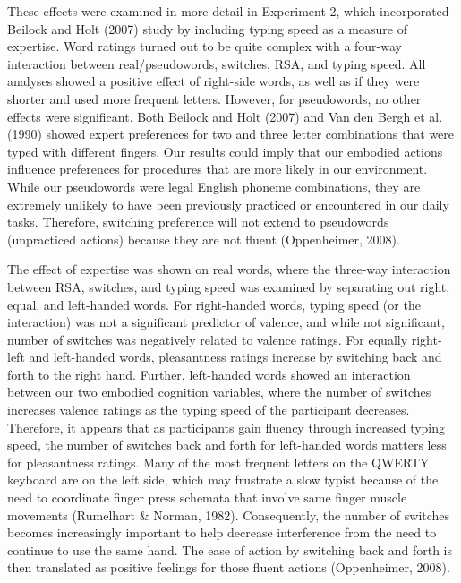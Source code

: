 \documentclass[english,man]{apa6}
\theoremstyle{definition}
\theoremstyle{definition}
\theoremstyle{definition}
\theoremstyle{remark}
\begin{document}
These effects were examined in more detail in Experiment 2, which
incorporated Beilock and Holt (2007) study by including typing speed as
a measure of expertise. Word ratings turned out to be quite complex with
a four-way interaction between real/pseudowords, switches, RSA, and
typing speed. All analyses showed a positive effect of right-side words,
as well as if they were shorter and used more frequent letters. However,
for pseudowords, no other effects were significant. Both Beilock and
Holt (2007) and Van den Bergh et al. (1990) showed expert preferences
for two and three letter combinations that were typed with different
fingers. Our results could imply that our embodied actions influence
preferences for procedures that are more likely in our environment.
While our pseudowords were legal English phoneme combinations, they are
extremely unlikely to have been previously practiced or encountered in
our daily tasks. Therefore, switching preference will not extend to
pseudowords (unpracticed actions) because they are not fluent
(Oppenheimer, 2008).

The effect of expertise was shown on real words, where the three-way
interaction between RSA, switches, and typing speed was examined by
separating out right, equal, and left-handed words. For right-handed
words, typing speed (or the interaction) was not a significant predictor
of valence, and while not significant, number of switches was negatively
related to valence ratings. For equally right-left and left-handed
words, pleasantness ratings increase by switching back and forth to the
right hand. Further, left-handed words showed an interaction between our
two embodied cognition variables, where the number of switches increases
valence ratings as the typing speed of the participant decreases.
Therefore, it appears that as participants gain fluency through
increased typing speed, the number of switches back and forth for
left-handed words matters less for pleasantness ratings. Many of the
most frequent letters on the QWERTY keyboard are on the left side, which
may frustrate a slow typist because of the need to coordinate finger
press schemata that involve same finger muscle movements (Rumelhart \&
Norman, 1982). Consequently, the number of switches becomes increasingly
important to help decrease interference from the need to continue to use
the same hand. The ease of action by switching back and forth is then
translated as positive feelings for those fluent actions (Oppenheimer,
2008).
\end{document}
